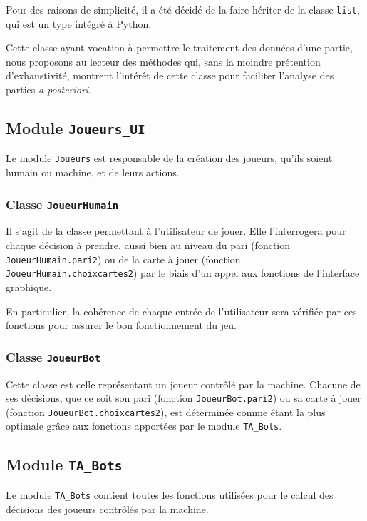          Pour des raisons de simplicité, il a été décidé de la faire hériter de la classe \texttt{list}, qui est un type intégré à Python.

         Cette classe ayant vocation à permettre le traitement des données d'une partie, nous proposons au lecteur des méthodes qui, sans la moindre prétention d'exhaustivité, montrent l'intérêt de cette classe pour faciliter l'analyse des parties \textit{a posteriori}.

   \subsection{Module \texttt{Joueurs\_UI}}\label{subsec:module-joueurs}
      Le module \texttt{Joueurs} est responsable de la création des joueurs, qu'ils soient humain ou machine, et de leurs actions.

      \subsubsection{Classe \texttt{JoueurHumain}}
         Il s'agit de la classe permettant à l'utilisateur de jouer.
         Elle l'interrogera pour chaque décision à prendre, aussi bien au niveau du pari (fonction \texttt{JoueurHumain.pari2}) ou de la carte à jouer (fonction \texttt{JoueurHumain.choixcartes2}) par le biais d'un appel aux fonctions de l'interface graphique.

         En particulier, la cohérence de chaque entrée de l'utilisateur sera vérifiée par ces fonctions pour assurer le bon fonctionnement du jeu.

      \subsubsection{Classe \texttt{JoueurBot}}
         Cette classe est celle représentant un joueur contrôlé par la machine.
         Chacune de ses décisions, que ce soit son pari (fonction \texttt{JoueurBot.pari2}) ou sa carte à jouer (fonction \texttt{JoueurBot.choixcartes2}), est déterminée comme étant la plus optimale grâce aux fonctions apportées par le module \texttt{TA\_Bots}.
   
   \subsection{Module \texttt{TA\_Bots}}\label{subsec:module-ta-bots}
      Le module \texttt{TA\_Bots} contient toutes les fonctions utilisées pour le calcul des décisions des joueurs contrôlés par la machine.

